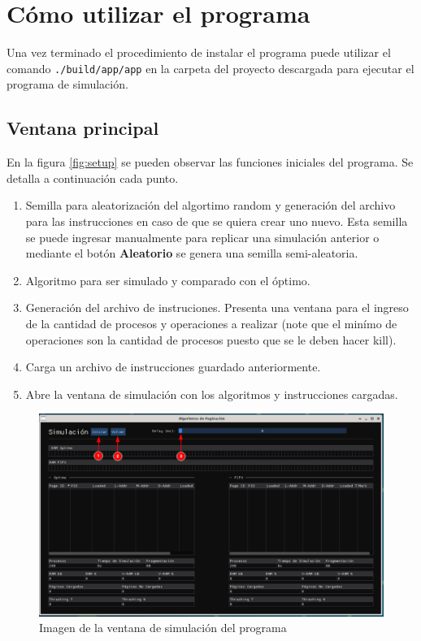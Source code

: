 \documentclass{report}
\begin{document}
\section{Cómo utilizar el programa}
Una vez terminado el procedimiento de instalar el programa puede utilizar el comando \texttt{./build/app/app} en la carpeta del proyecto descargada para ejecutar el programa de simulación.

\subsection{Ventana principal}
En la figura  \ref{fig:setup} se pueden observar las funciones iniciales del programa. Se detalla a continuación cada punto.

\begin{enumerate}
	\item Semilla para aleatorización del algortimo random y generación del archivo para las instrucciones en caso de que se quiera crear uno nuevo. Esta semilla se puede ingresar manualmente para replicar una simulación anterior o mediante el botón \textbf{Aleatorio} se genera una semilla semi-aleatoria.
	\item Algoritmo para ser simulado y comparado con el óptimo.
	\item Generación del archivo de instruciones. Presenta una ventana para el ingreso de la cantidad de procesos y operaciones a realizar (note que el minímo de operaciones son la cantidad de procesos puesto que se le deben hacer kill).
	\item Carga un archivo de instrucciones guardado anteriormente.
	\item Abre la ventana de simulación con los algoritmos y instrucciones cargadas.
\end{enumerate}

\begin{figure}[h]
	\centering
	\includegraphics[width=0.99\linewidth]{figuras/guide/simul_window.png}
	\caption{Imagen de la ventana de simulación del programa}
	\label{fig:simul}
\end{figure}
\end{document}
